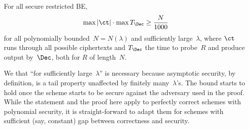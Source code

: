 \begin{theorem}\label{thm:lower-bound}
For all secure restricted BE,
\begin{align*}
\max{|\ct|}\cdot\max{T_\Dec}\geq\frac{N}{1000}
\end{align*}
for all polynomially bounded~${N=N(\lambda)}$ and sufficiently large~$\lambda$,
where $\ct$ runs through all possible ciphertexts and
$T_\Dec$ the time to probe~$R$ and produce output by~$\Dec$,
both for $R$ of length~$N$.
\end{theorem}

\noindent
We  that ``for sufficiently large~$\lambda$''
is necessary because asymptotic security, by definition, is
a tail property unaffected by finitely many~$\lambda$'s.
The bound starts to hold once the scheme starts to be secure
against the adversary used in the proof.
While the statement and the proof here
apply to perfectly correct schemes with polynomial security,
it is straight-forward to adapt them
for schemes with sufficient (say, constant) gap
between correctness and security.
